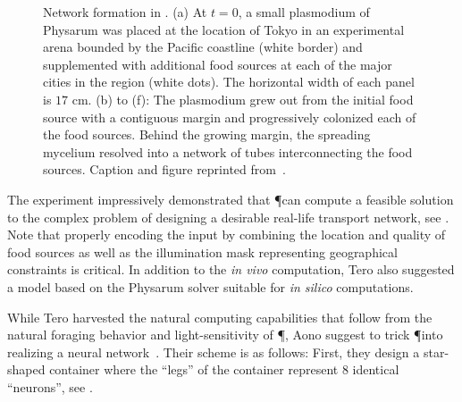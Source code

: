 			\begin{figure}
				\centering
				\newline
				
				
				\caption[Tokyo railway experiment]{Network formation in \Pp. (a) At $t = 0$, a small plasmodium of Physarum was placed at the location of Tokyo in an experimental arena bounded by the Pacific coastline (white border) and supplemented with additional food sources at each of the major cities in the region (white dots). The horizontal width of each panel is $17$ cm. (b) to (f): The plasmodium grew out from the initial food source with a contiguous margin and progressively colonized each of the food sources. Behind the growing margin, the spreading mycelium resolved into a network of tubes interconnecting the food sources. Caption and figure reprinted from~\cite{Tero439}.}
				\label{fig:tokyo}
			\end{figure}

			The experiment impressively demonstrated that \P can compute a feasible solution to the complex problem of designing a desirable real-life transport network, see . Note that properly encoding the input by combining the location and quality of food sources as well as the illumination mask representing geographical constraints is critical. In addition to the \textit{in vivo} computation, Tero \etal also suggested a model based on the Physarum solver suitable for \textit{in silico} computations.

			\FloatBarrier

			While Tero \etal harvested the natural computing capabilities that follow from the natural foraging behavior and light-sensitivity of \P, Aono \etal suggest to trick \P into realizing a neural network~\cite{Aono:2007:ANC:1284621.1284651,Aono2009,Aono2007,Aono200883}. Their scheme is as follows: First, they design a star-shaped container where the ``legs'' of the container represent $8$ identical ``neurons'', see . 

